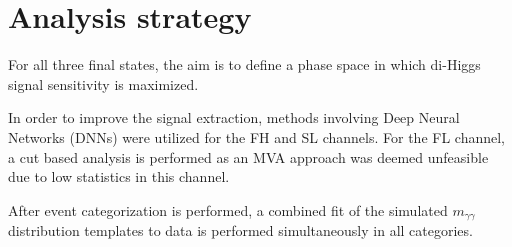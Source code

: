 \section{Analysis strategy} \label{sec:AnalysisStrategy}

For all three final states, the aim is to define a phase space in which di-Higgs signal sensitivity is maximized. 

In order to improve the signal extraction, methods involving Deep Neural Networks (DNNs) were utilized for the
FH and SL channels. For the FL channel, a cut based analysis is performed as an MVA approach was deemed unfeasible 
due to low statistics in this channel. 

After event categorization is performed, a combined fit of the simulated $m_{\gamma\gamma}$ distribution templates to data is performed simultaneously in all categories.




